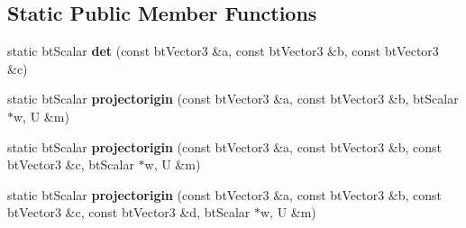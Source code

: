 \subsection*{Static Public Member Functions}
\begin{DoxyCompactItemize}
\item 
\hypertarget{structgjkepa2__impl_1_1_g_j_k_a8749f1a765d65393514efcd1b6092a1b}{static bt\+Scalar {\bfseries det} (const bt\+Vector3 \&a, const bt\+Vector3 \&b, const bt\+Vector3 \&c)}\label{structgjkepa2__impl_1_1_g_j_k_a8749f1a765d65393514efcd1b6092a1b}

\item 
\hypertarget{structgjkepa2__impl_1_1_g_j_k_aee41f08026e70a25f007116118a87bed}{static bt\+Scalar {\bfseries projectorigin} (const bt\+Vector3 \&a, const bt\+Vector3 \&b, bt\+Scalar $\ast$w, U \&m)}\label{structgjkepa2__impl_1_1_g_j_k_aee41f08026e70a25f007116118a87bed}

\item 
\hypertarget{structgjkepa2__impl_1_1_g_j_k_abbb0c6f4e1d031edeffd3b90a18aa308}{static bt\+Scalar {\bfseries projectorigin} (const bt\+Vector3 \&a, const bt\+Vector3 \&b, const bt\+Vector3 \&c, bt\+Scalar $\ast$w, U \&m)}\label{structgjkepa2__impl_1_1_g_j_k_abbb0c6f4e1d031edeffd3b90a18aa308}

\item 
\hypertarget{structgjkepa2__impl_1_1_g_j_k_abfb3f7083d409d013152ff7c1a696bd4}{static bt\+Scalar {\bfseries projectorigin} (const bt\+Vector3 \&a, const bt\+Vector3 \&b, const bt\+Vector3 \&c, const bt\+Vector3 \&d, bt\+Scalar $\ast$w, U \&m)}\label{structgjkepa2__impl_1_1_g_j_k_abfb3f7083d409d013152ff7c1a696bd4}

\end{DoxyCompactItemize}
